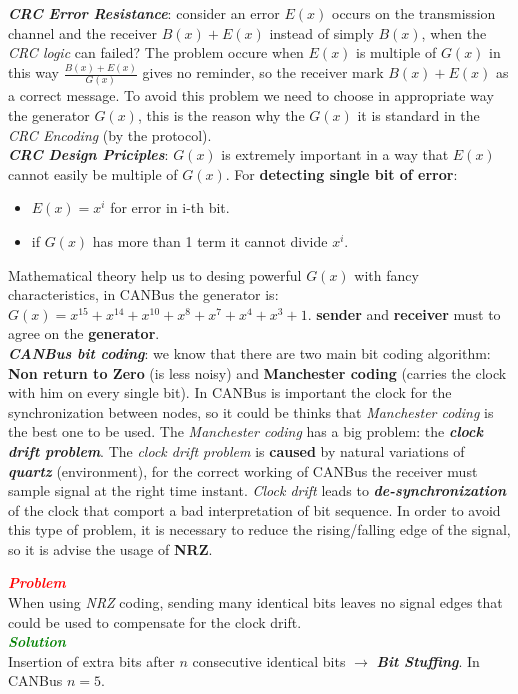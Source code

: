 \textbf{\textit{CRC Error Resistance}}: consider an error $E(x)$ occurs on the transmission channel and the receiver $B(x) + E(x)$ instead of simply $B(x)$, when the \textit{CRC logic} can failed? The problem occure when $E(x)$ is multiple of $G(x)$ in this way $\frac{B(x) + E(x)}{G(x)}$ gives no reminder, so the receiver mark $B(x) + E(x)$ as a correct message. To avoid this problem we need to choose in appropriate way the generator $G(x)$, this is the reason why the $G(x)$ it is standard in the \textit{CRC Encoding} (by the protocol). \\ \newline
\textbf{\textit{CRC Design Priciples}}: $G(x)$ is extremely important in a way that $E(x)$ cannot easily be multiple of $G(x)$. For \textbf{detecting single bit of error}:
\begin{itemize}[nosep]
    \item $E(x) = x^i$ for error in i-th bit.
    \item if $G(x)$ has more than 1 term it cannot divide $x^i$.
\end{itemize}
Mathematical theory help us to desing powerful $G(x)$ with fancy characteristics, in CANBus the generator is: $G(x) = x^{15}+ x^{14} + x^{10} + x^8 + x^7 + x^4 + x^3 + 1$. \textbf{sender} and \textbf{receiver} must to agree on the \textbf{generator}. \\ \newline
\textbf{\textit{CANBus bit coding}}: we know that there are two main bit coding algorithm: \textbf{Non return to Zero} (is less noisy) and \textbf{Manchester coding} (carries the clock with him on every single bit). In CANBus is important the clock for the synchronization between nodes, so it could be thinks that \textit{Manchester coding} is the best one to be used. The \textit{Manchester coding} has a big problem: the \textbf{\textit{clock drift problem}}. The \textit{clock drift problem} is \textbf{caused} by natural variations of \textbf{\textit{quartz}} (environment), for the correct working of CANBus the receiver must sample signal at the right time instant. \textit{Clock drift} leads to \textbf{\textit{de-synchronization}} of the clock that comport a bad interpretation of bit sequence. In order to avoid this type of problem, it is necessary to reduce the rising/falling edge of the signal, so it is advise the usage of \textbf{NRZ}.
\begin{boxA}
    \textcolor{red}{\textit{\textbf{Problem}}} \\
    When using \textit{NRZ} coding, sending many identical bits leaves no signal edges that could be used to compensate for the clock drift. \\ \newline
    \textcolor{green}{\textbf{\textit{Solution}}} \\
    Insertion of extra bits after $n$ consecutive identical bits $\rightarrow$ \textbf{\textit{Bit Stuffing}}. In CANBus $n=5$.
\end{boxA}

